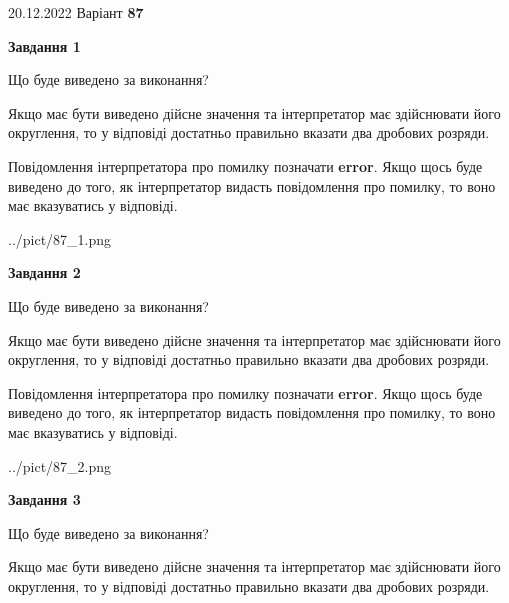 \documentclass[12pt, ukrainian]{article}
\begin{document}
{20.12.2022 Варіант \No \textbf { 87 }\par}
{
\begin {Large}

{\begin {center}\textbf{Завдання 1}\end {center}}\par
Що буде виведено за виконання? \par

Якщо має бути виведено дійсне значення та інтерпретатор має здійснювати його округлення, 
то у відповіді достатньо правильно вказати два дробових розряди.

Повідомлення інтерпретатора про помилку позначати \textbf{error}.
Якщо щось буде виведено до того, як інтерпретатор видасть повідомлення про помилку, 
то воно має вказуватись у відповіді. \par

\begin{center}
	{../pict/87_1.png}
\end{center}
\newpage

{\begin {center}\textbf{Завдання 2}\end {center}}\par
Що буде виведено за виконання? \par

Якщо має бути виведено дійсне значення та інтерпретатор має здійснювати його округлення, 
то у відповіді достатньо правильно вказати два дробових розряди.

Повідомлення інтерпретатора про помилку позначати \textbf{error}.
Якщо щось буде виведено до того, як інтерпретатор видасть повідомлення про помилку, 
то воно має вказуватись у відповіді. \par

\begin{center}
	{../pict/87_2.png}
\end{center}
\newpage

{\begin {center}\textbf{Завдання 3}\end {center}}\par
Що буде виведено за виконання? \par

Якщо має бути виведено дійсне значення та інтерпретатор має здійснювати його округлення, 
то у відповіді достатньо правильно вказати два дробових розряди.


\end{Large}}
\end{document}
